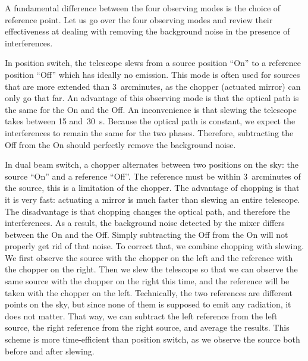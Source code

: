 A fundamental difference between the four observing modes is the choice of reference point. Let us go over the four observing modes and review their effectiveness at dealing with removing the background noise in the presence of interferences.

\label{par:position_switch}In position switch, the telescope slews from a source position ``On'' to a reference position ``Off'' which has ideally no emission.
This mode is often used for sources that are more extended than 3~arcminutes, as the chopper (actuated mirror) can only go that far.
An advantage of this observing mode is that the optical path is the same for the On and the Off.
An inconvenience is that slewing the telescope takes between \num{15} and~\SI{30}{\second}.
Because the optical path is constant, we expect the interferences to remain the same for the two phases.
Therefore, subtracting the Off from the On should perfectly remove the background noise.

\label{par:dual_beam_switch}In dual beam switch, a chopper alternates between two positions on the sky: the source ``On'' and a reference ``Off''.
The reference must be within 3~arcminutes of the source, this is a limitation of the chopper.
The advantage of chopping is that it is very fast: actuating a mirror is much faster than slewing an entire telescope.
The disadvantage is that chopping changes the optical path, and therefore the interferences.
As a result, the background noise detected by the mixer differs between the On and the Off.
Simply subtracting the Off from the On will not properly get rid of that noise.
To correct that, we combine chopping with slewing.
We first observe the source with the chopper on the left and the reference with the chopper on the right.
Then we slew the telescope so that we can observe the same source with the chopper on the right this time, and the reference will be taken with the chopper on the left.
Technically, the two references are different points on the sky, but since none of them is supposed to emit any radiation, it does not matter.
That way, we can subtract the left reference from the left source, the right reference from the right source, and average the results.
This scheme is more time-efficient than position switch, as we observe the source both before and after slewing.

